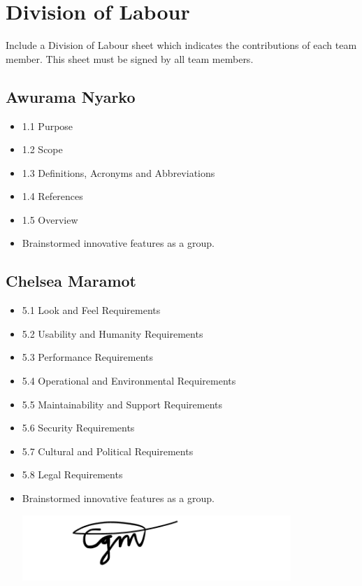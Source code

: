 \documentclass[]{article}
\begin{document}

\appendix
\section{Division of Labour}
\label{sec:division_of_labour}
Include a Division of Labour sheet which indicates the contributions of each team member. This sheet must be signed by all team members.
\subsection{Awurama Nyarko}
\label{subsec:awurama_nyarko}
\begin{itemize}
	\item 1.1 Purpose
 	\item 1.2 Scope
  	\item 1.3 Definitions, Acronyms and Abbreviations
   	\item 1.4 References
    	\item 1.5 Overview
     	\item Brainstormed innovative features as a group.
\end{itemize}

\subsection{Chelsea Maramot}
\label{subsec:chelsea_maramot}
\begin{itemize}
	\item 5.1 Look and Feel Requirements
 	\item 5.2 Usability and Humanity Requirements
  	\item 5.3 Performance Requirements
   	\item 5.4 Operational and Environmental Requirements
    	\item 5.5 Maintainability and Support Requirements
     	\item 5.6 Security Requirements
      	\item 5.7 Cultural and Political Requirements
       	\item 5.8 Legal Requirements
	\item Brainstormed innovative features as a group.
	
	\includegraphics[width=0.8\textwidth]{chelsea.png}
\end{itemize}
\end{document}
